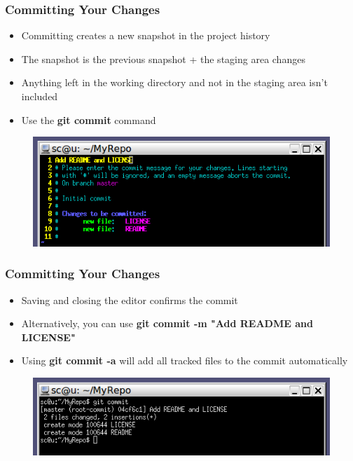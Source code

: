 \documentclass{beamer}
\begin{document}
\begin{frame}
	\frametitle{Committing Your Changes}
	\begin{itemize}
		\item{Committing creates a new snapshot in the project history}
		\item{The snapshot is the previous snapshot + the staging area changes}
		\item{Anything left in the working directory and not in the staging area isn't included}
		\item{Use the \textbf{git commit} command}
	\end{itemize}
	\begin{figure}
		\includegraphics[scale=0.62]{Committing_Your_Changes-0.png}
	\end{figure}

\end{frame}

\begin{frame}
	\frametitle{Committing Your Changes}
	\begin{itemize}
		\item{Saving and closing the editor confirms the commit}
		\item{Alternatively, you can use \textbf{git commit -m "Add README and LICENSE"}}
		\item{Using \textbf{git commit -a} will add all tracked files to the commit automatically}
	\end{itemize}
	\begin{figure}
		\includegraphics[scale=0.62]{Committing_Your_Changes-1.png}
	\end{figure}
\end{frame}
\end{document}
